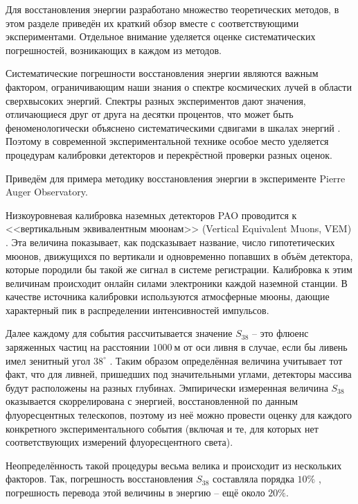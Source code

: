 Для восстановления энергии разработано множество теоретических методов, в этом разделе приведён их краткий обзор вместе с соответствующими экспериментами. Отдельное внимание уделяется оценке систематических погрешностей, возникающих в каждом из методов.

Систематические погрешности восстановления энергии являются важным фактором, ограничивающим наши знания о спектре космических лучей в области сверхвысоких энергий. Спектры разных экспериментов дают значения, отличающиеся друг от друга на десятки процентов, что может быть феноменологически объяснено систематическими сдвигами в шкалах энергий \cite{wg2013}. Поэтому в современной экспериментальной технике особое место уделяется процедурам калибровки детекторов и перекрёстной проверки разных оценок.

Приведём для примера методику восстановления энергии в эксперименте Pierre Auger Observatory.

Низкоуровневая калибровка наземных детекторов PAO проводится к <<вертикальным эквивалентным мюонам>> (Vertical Equivalent Muons, VEM) \cite{Bertou2006}. Эта величина показывает, как подсказывает название, число гипотетических мюонов, движущихся по вертикали и одновременно попавших в объём детектора, которые породили бы такой же сигнал в системе регистрации. Калибровка к этим величинам происходит онлайн силами электроники каждой наземной станции. В качестве источника калибровки используются атмосферные мюоны, дающие характерный пик в распределении интенсивностей импульсов.

Далее каждому для события рассчитывается значение $S_{38}$ -- это флюенс заряженных частиц на расстоянии $1000~\text{м}$ от оси ливня в случае, если бы ливень имел зенитный угол $38^{\circ}$ \cite{PAO-ICRC-2005}. Таким образом определённая величина учитывает тот факт, что для ливней, пришедших под значительными углами, детекторы массива будут расположены на разных глубинах. Эмпирически измеренная величина $S_{38}$ оказывается скоррелирована с энергией, восстановленной по данным флуоресцентных телескопов, поэтому из неё можно провести оценку для каждого конкретного экспериментального события (включая и те, для которых нет соответствующих измерений флуоресцентного света).

Неопределённость такой процедуры весьма велика и происходит из нескольких факторов. Так, погрешность восстановления $S_{38}$ составляла порядка $10 \%$ \cite{Collaboration2005}, погрешность перевода этой величины в энергию -- ещё около $20 \%$.
